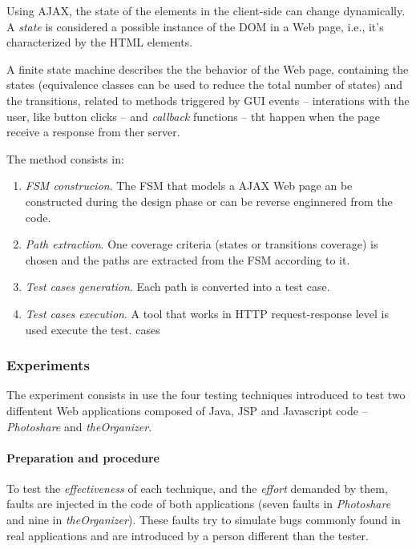 \documentclass[a4paper]{article}
\begin{document}
Using AJAX, the state of the elements in the client-side can change dynamically.
A \emph{state} is considered a possible instance of the DOM in a Web page, i.e., it's characterized by the HTML elements.

A finite state machine describes the the behavior of the Web page, containing the states (equivalence classes can be used to reduce the total number of states) and the transitions, related to methods triggered by GUI events -- interations with the user, like button clicks -- and \emph{callback} functions -- tht happen when the page receive a response from ther server.

The method consists in: 

\begin{enumerate}
\item \emph{FSM construcion}. The FSM that models a AJAX Web page an be constructed during the design phase or can be reverse enginnered from the code.
\item \emph{Path extraction}. One coverage criteria (states or transitions coverage) is chosen and the paths are extracted from the FSM according to it.
\item \emph{Test cases generation}. Each path is converted into a test case.
\item \emph{Test cases execution}. A tool that works in HTTP request-response level is used execute the test. cases
\end{enumerate}

\subsubsection{Experiments}

The experiment consists in use the four testing techniques introduced to test two diffentent Web applications composed of Java, JSP and Javascript code -- \emph{Photoshare} and \emph{theOrganizer}.

\paragraph{Preparation and procedure}

To test the \emph{effectiveness} of each technique, and the \emph{effort} demanded by them, faults are injected in the code of both applications (seven faults in \emph{Photoshare} and nine in \emph{theOrganizer}).
These faults try to simulate bugs commonly found in real applications and are introduced by a person different than the tester.
\end{document}
